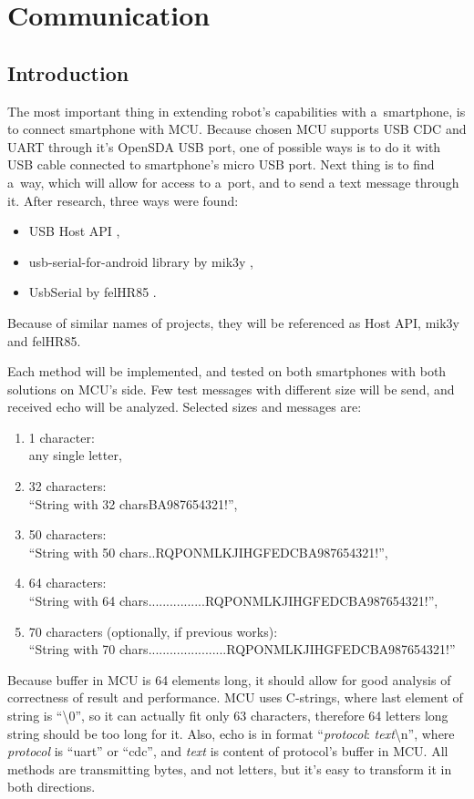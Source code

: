 \chapter{Communication}

\section{Introduction}
The most important thing in extending robot's capabilities with a~smartphone, is
to connect smartphone with MCU.
Because chosen MCU supports USB CDC and UART through it's OpenSDA USB port, one
of possible ways is to do it with USB cable connected to smartphone's micro USB port.
Next thing is to find a~way, which will allow for access to a~port, and to send
a text message through it.
After research, three ways were found:
\begin{itemize}
  \item USB Host API \cite{android_reference},
  \item usb-serial-for-android library by mik3y \cite{mik3y},
  \item UsbSerial by felHR85 \cite{felHR85}.
\end{itemize}
Because of similar names of projects, they will be referenced as Host API,
mik3y and felHR85.

Each method will be implemented, and tested on both smartphones with both
solutions on MCU's side.
Few test messages with different size will be send, and received echo will be
analyzed.
Selected sizes and messages are:
\begin{enumerate}
  \item 1 character:\\
  	any single letter,
  \item 32 characters:\\
  	``String with 32 charsBA987654321!'',
  \item 50 characters:\\
  	``String with 50 chars..RQPONMLKJIHGFEDCBA987654321!'',
  \item 64 characters:\\
  	``String with 64 chars................RQPONMLKJIHGFEDCBA987654321!'',
  \item 70 characters (optionally, if previous works):\\
  	``String with 70 chars......................RQPONMLKJIHGFEDCBA987654321!''
\end{enumerate}
Because buffer in MCU is 64 elements long, it should allow for good analysis of
correctness of result and performance.
MCU uses C-strings, where last element of string is ``\textbackslash 0'', so it
can actually fit only 63 characters, therefore 64 letters long string should be
too long for it.
Also, echo is in format ``\emph{protocol}: \emph{text}\textbackslash n'', where
\emph{protocol} is ``uart'' or ``cdc'', and \emph{text} is content of protocol's
buffer in MCU.
All methods are transmitting bytes, and not letters, but it's easy to transform
it in both directions.

